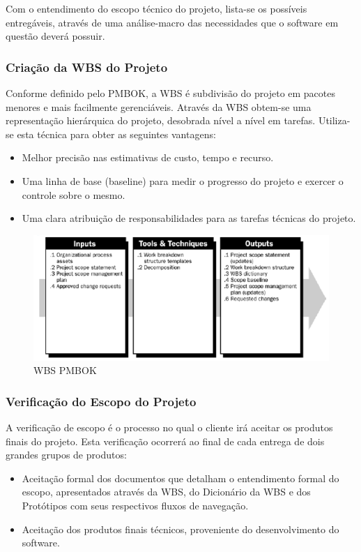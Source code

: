 Com o entendimento do escopo técnico do projeto, lista-se os possíveis entregáveis, através de uma análise-macro das necessidades que o software em questão deverá possuir.

\subsubsection{Criação da WBS do Projeto}

Conforme definido pelo PMBOK, a WBS é subdivisão do projeto em pacotes menores e mais facilmente gerenciáveis. Através da WBS obtem-se uma representação hierárquica do projeto, desobrada nível a nível em tarefas.
Utiliza-se esta técnica para obter as seguintes vantagens:
\begin{itemize}
\item Melhor precisão nas estimativas de custo, tempo e recurso.
\item Uma linha de base (baseline) para medir o progresso do projeto e exercer o controle sobre o mesmo.
\item Uma clara atribuição de responsabilidades para as tarefas técnicas do projeto.
\end{itemize}

\begin{figure}[H]
  \centering
  \includegraphics[width=1\textwidth]{softwareengineer/images/pmbok-wbs} 
  \caption{WBS PMBOK}
  \label{fig:pmbok-wbs} 
\end{figure}

\subsubsection{Verificação do Escopo do Projeto}

A verificação de escopo é o processo no qual o cliente irá aceitar os produtos finais do projeto. Esta verificação ocorrerá ao final de cada entrega de dois grandes grupos de produtos:
 
\begin{itemize}
\item Aceitação formal dos documentos que detalham o entendimento formal do escopo, apresentados através da WBS, do Dicionário da WBS e dos Protótipos com seus respectivos fluxos de navegação.
 
\item Aceitação dos produtos finais técnicos, proveniente do desenvolvimento do software.
\end{itemize}
 
